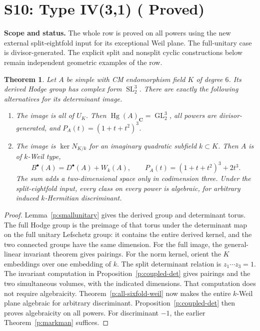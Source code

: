 \documentclass[11pt,reqno]{article}
\theoremstyle{emphasizedplain}
\DeclareRobustCommand{\provedstatus}{%
  \texorpdfstring{\textcolor{ProvedGreen}{\textbf{Proved}}}{Proved}}
\newtheorem{theorem}{Theorem}[section]
\theoremstyle{emphasizeddefinition}
\theoremstyle{emphasizeddefinition}
\DeclareMathOperator{\Hg}{Hg}
\DeclareMathOperator{\GL}{GL}
\DeclareMathOperator{\SL}{SL}
\newcommand{\C}{\mathbf C}
\newcommand{\status}[1]{%
  \par\nobreak\smallskip\noindent
  {\setlength{\fboxsep}{7pt}%
   \colorbox{ScopeBackground}{%
    \parbox{\dimexpr\linewidth-2\fboxsep\relax}{%
     \small\textbf{\textcolor{HeadingInk}{Scope and status.}} #1}}}%
  \par\nobreak\medskip}
\begin{document}
\section{S10: Type IV(3,1) (\provedstatus)}\label{sec:S10}

\status{The whole row is proved on all powers using the new external
split-eightfold input for its exceptional Weil plane. The full-unitary
case is divisor-generated. The explicit split and nonsplit cyclic
constructions below remain independent geometric examples of the row.}
\begin{theorem}
Let $A$ be simple with CM endomorphism field $K$ of degree $6$.
Its derived Hodge group has complex form $\SL_{2}^{3}$.
There are exactly the following alternatives for its determinant image.
\begin{enumerate}
\item The image is all of $U_K$. Then $\Hg(A)_\C=\GL_{2}^{3}$,
all powers are divisor-generated, and $P_A(t)=(1+t+t^2)^3$.
\item The image is $\ker N_{K/k}$ for an imaginary quadratic subfield
$k\subset K$. Then $A$ is of $k$-Weil type,
\[
 B^\bullet(A)=D^\bullet(A)+W_k(A),\qquad
 P_A(t)=(1+t+t^2)^3+2t^3.
\]
The sum adds a two-dimensional space only in codimension three.
Under the split-eightfold input, every class on every power is
algebraic, for arbitrary induced $k$-Hermitian discriminant.
\end{enumerate}
\end{theorem}
\begin{proof}
Lemma~\ref{p:smallunitary} gives the derived group and determinant torus.
The full Hodge group is the preimage of that torus under the determinant
map on the full unitary Lefschetz group: it contains the entire derived
kernel, and the two connected groups have the same dimension.
For the full image, the general-linear invariant theorem gives pairings.
For the norm kernel, orient the $K$ embeddings over one embedding of $k$.
The split determinant relation is $z_1\cdots z_{3}=1$.
The invariant computation in Proposition~\ref{p:coupled-det} gives pairings
and the two simultaneous volumes, with the indicated dimensions. That
computation does not require algebraicity. Theorem~\ref{p:all-sixfold-weil}
now makes the entire $k$-Weil plane algebraic for arbitrary discriminant.
Proposition~\ref{p:coupled-det} then proves algebraicity on all powers.
For discriminant $-1$, the earlier Theorem~\ref{p:markman} suffices.
\end{proof}
\end{document}
